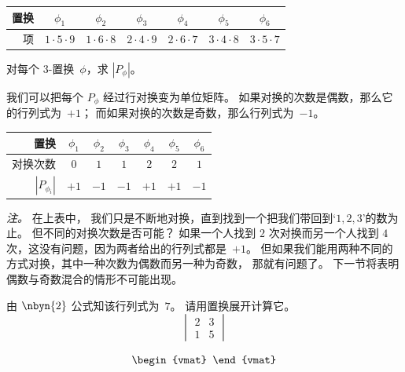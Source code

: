 \begin{exercises}
\begin{answer}
\begin{center}
\begin{tabular}{r|cccccc}
          置换
            &$\phi_1$ &$\phi_2$ &$\phi_3$ &$\phi_4$ &$\phi_5$ &$\phi_6$  \\
          \hline
          项
           &$1\cdot 5\cdot 9$
           &$1\cdot 6\cdot 8$
           &$2\cdot 4\cdot 9$
           &$2\cdot 6\cdot 7$
           &$3\cdot 4\cdot 8$
           &$3\cdot 5\cdot 7$
        \end{tabular}
      \end{center}
    \end{answer}
  \recommended \item 对每个 $3$-置换~$\phi$，求 $|P_\phi|$。
    \begin{answer}
      我们可以把每个 $P_{\phi}$ 经过行对换变为单位矩阵。
      如果对换的次数是偶数，那么它的行列式为~$+1$；
      而如果对换的次数是奇数，那么行列式为~$-1$。
      \begin{center}
        \begin{tabular}{r|cccccc}
          置换
            &$\phi_1$ &$\phi_2$ &$\phi_3$ &$\phi_4$ &$\phi_5$ &$\phi_6$  \\
          \hline
          对换次数 &$0$
                  &$1$
                  &$1$
                  &$2$
                  &$2$
                  &$1$  \\
          $|P_{\phi_i}|$
           &$+1$
           &$-1$
           &$-1$
           &$+1$
           &$+1$
           &$-1$
        \end{tabular}
      \end{center}
      \textit{注。}
      在上表中，
      我们只是不断地对换，直到找到一个把我们带回到`$1,2,3$'的数为止。
      但不同的对换次数是否可能？
      如果一个人找到 $2$ 次对换而另一个人找到
      $4$ 次，这没有问题，因为两者给出的行列式都是~$+1$。
      但如果我们能用两种不同的方式对换，其中一种次数为偶数而另一种为奇数，
      那就有问题了。
      下一节将表明偶数与奇数混合的情形不可能出现。
    \end{answer}
  \item 由 $\nbyn{2}$ 公式知该行列式为~$7$。
    请用置换展开计算它。
    \begin{equation*}
      \begin{vmatrix}
        2 &3 \\
        1 &5
      \end{vmatrix}
    \end{equation*}
    \begin{answer}
      \begin{align*}
        \begin{vmat}

\end{vmat}
\end{align*}
\end{answer}
\end{exercises}
